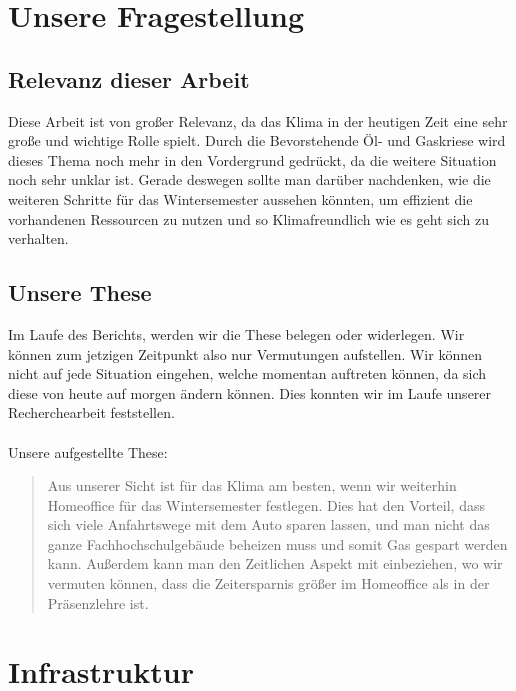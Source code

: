 \documentclass[a4paper,12pt]{scrartcl}
\begin{document}
\newpage

\section{Unsere Fragestellung}
\subsection{Relevanz dieser Arbeit}
Diese Arbeit ist von großer Relevanz, da das Klima in der heutigen Zeit eine sehr große und wichtige Rolle spielt. Durch die Bevorstehende Öl- und Gaskriese wird dieses Thema noch mehr in den Vordergrund gedrückt, da die weitere Situation noch sehr unklar ist. Gerade deswegen sollte man darüber nachdenken, wie die weiteren Schritte für das Wintersemester aussehen könnten, um effizient die vorhandenen Ressourcen zu nutzen und so Klimafreundlich wie es geht sich zu verhalten.

\subsection{Unsere These}
Im Laufe des Berichts, werden wir die These belegen oder widerlegen. Wir können zum jetzigen Zeitpunkt also nur Vermutungen aufstellen. Wir können nicht auf jede Situation eingehen, welche momentan auftreten können, da sich diese von heute auf morgen ändern können. Dies konnten wir im Laufe unserer Recherchearbeit feststellen.\\\\

Unsere aufgestellte These:\\
\blockquote{Aus unserer Sicht ist für das Klima am besten, wenn wir weiterhin Homeoffice für das Wintersemester festlegen. Dies hat den Vorteil, dass sich viele Anfahrtswege mit dem Auto sparen lassen, und man nicht das ganze Fachhochschulgebäude beheizen muss und somit Gas gespart werden kann. Außerdem kann man den Zeitlichen Aspekt mit einbeziehen, wo wir vermuten können, dass die Zeitersparnis größer im Homeoffice als in der Präsenzlehre ist.}

\section{Infrastruktur}
\end{document}
